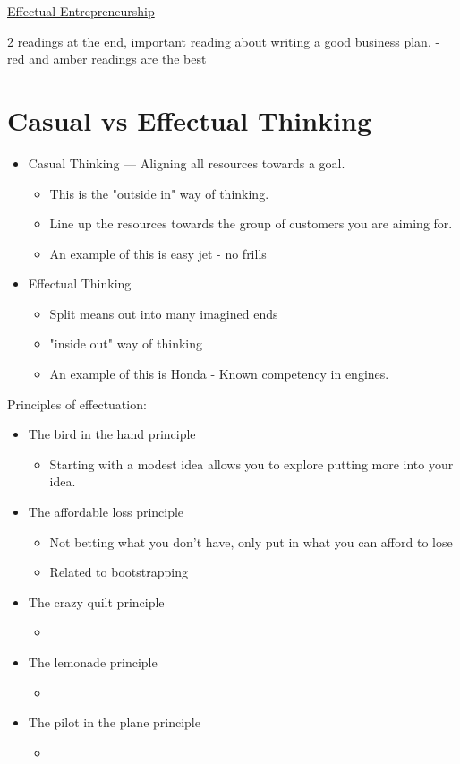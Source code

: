 \documentclass{article}[18pt]
\begin{document}
\begin{center}
\underline{\huge Effectual Entrepreneurship}
\end{center}
2 readings at the end, important reading about writing a good business plan. - red and amber readings are the best
\section{Casual vs Effectual Thinking}
\begin{itemize}
	\item Casual Thinking — Aligning all resources towards a goal.
	\begin{itemize}
		\item This is the "outside in" way of thinking.
		\item Line up the resources towards the group of customers you are aiming for.
		\item An example of this is easy jet - no frills
	\end{itemize}
	\item Effectual Thinking
	\begin{itemize}
		\item Split means out into many imagined ends
		\item "inside out" way of thinking
		\item An example of this is Honda - Known competency in engines.
	\end{itemize}
\end{itemize}
Principles of effectuation:
\begin{itemize}
	\item The bird in the hand principle
	\begin{itemize}
		\item Starting with a modest idea allows you to explore putting more into your idea.
	\end{itemize}

	\item The affordable loss principle
	\begin{itemize}
		\item Not betting what you don't have, only put in what you can afford to lose
		\item Related to bootstrapping
	\end{itemize}

	\item The crazy quilt principle
	\begin{itemize}
		\item 
	\end{itemize}

	\item The lemonade principle
	\begin{itemize}
		\item 
	\end{itemize}

	\item The pilot in the plane principle
	\begin{itemize}
		\item 
	\end{itemize}
\end{itemize}
\end{document}
